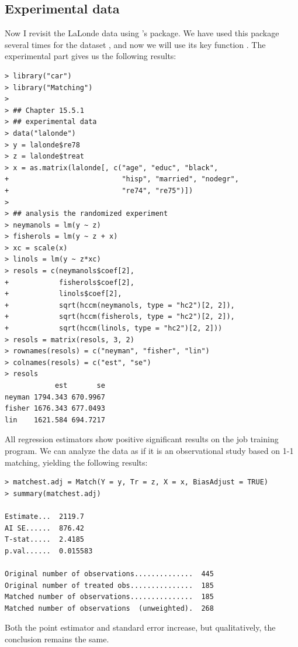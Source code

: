 \subsection{Experimental data}
Now I revisit the LaLonde data using \citet{sekhon2011multivariate}'s  package. We have used this package several times for the dataset , and now we will use its key function .  The experimental part gives us the following results:
\begin{lstlisting}
> library("car")
> library("Matching")
> 
> ## Chapter 15.5.1
> ## experimental data
> data("lalonde")
> y = lalonde$re78
> z = lalonde$treat
> x = as.matrix(lalonde[, c("age", "educ", "black",
+                           "hisp", "married", "nodegr",
+                           "re74", "re75")])
> 
> ## analysis the randomized experiment
> neymanols = lm(y ~ z)
> fisherols = lm(y ~ z + x)
> xc = scale(x)
> linols = lm(y ~ z*xc)
> resols = c(neymanols$coef[2],
+            fisherols$coef[2],
+            linols$coef[2],
+            sqrt(hccm(neymanols, type = "hc2")[2, 2]),
+            sqrt(hccm(fisherols, type = "hc2")[2, 2]),
+            sqrt(hccm(linols, type = "hc2")[2, 2]))
> resols = matrix(resols, 3, 2)
> rownames(resols) = c("neyman", "fisher", "lin")
> colnames(resols) = c("est", "se")
> resols 
            est       se
neyman 1794.343 670.9967
fisher 1676.343 677.0493
lin    1621.584 694.7217
\end{lstlisting} 
All regression estimators show positive significant results on the job training program. We can analyze the data as if it is an observational study based on 1-1 matching, yielding the following results:
\begin{lstlisting}
> matchest.adj = Match(Y = y, Tr = z, X = x, BiasAdjust = TRUE)
> summary(matchest.adj)

Estimate...  2119.7 
AI SE......  876.42 
T-stat.....  2.4185 
p.val......  0.015583 

Original number of observations..............  445 
Original number of treated obs...............  185 
Matched number of observations...............  185 
Matched number of observations  (unweighted).  268
\end{lstlisting} 
Both the point estimator and standard error increase, but qualitatively, the conclusion remains the same. 


